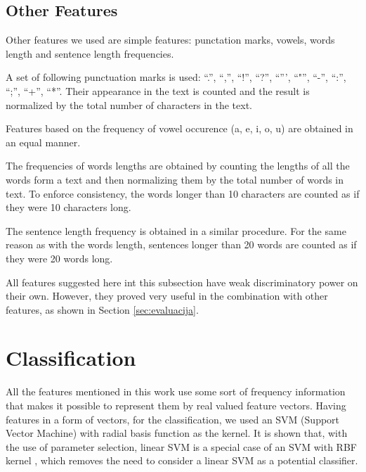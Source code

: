 \documentclass{llncs}
\begin{document}
\subsection{Other Features}
\label{sec:znacajke-manje}

Other features we used are simple features: punctation marks, vowels, words
length and sentence length frequencies.

A set of following punctuation marks is used: ``.'', ``,'', ``!'', ``?'',
``''', ``"'', ``-'', ``:'', ``;'', ``+'', ``*''. Their appearance in the text is counted and
the result is normalized by the total number of characters in the text. 

Features based on the frequency of vowel occurence (a, e, i, o, u) are
obtained in an equal manner.

The frequencies of words lengths are obtained by counting the lengths of all
the words form a text and then normalizing them by the total number of words in
text. To enforce consistency, the words longer than 10 characters are counted as
if they were 10 characters long.

The sentence length frequency is obtained in a similar procedure.
For the same reason as with the words length, sentences longer than 20 words are
counted as if they were 20 words long.

All features suggested here int this subsection have weak discriminatory power
on their own. However, they proved very useful in the combination with other features, as
shown in Section \ref{sec:evaluacija}.

\section{Classification}
All the features mentioned in this work use some sort of frequency information
that makes it possible to represent them by real valued feature vectors. Having
features in a form of vectors, for the classification, we used an SVM (Support
Vector Machine) with radial basis function as the kernel. It is shown that, with
the use of parameter selection, linear SVM is a special case of an SVM with RBF
kernel \cite{keerthi2003asymptotic}, which removes the need to consider a linear
SVM as a potential classifier.
\end{document}
